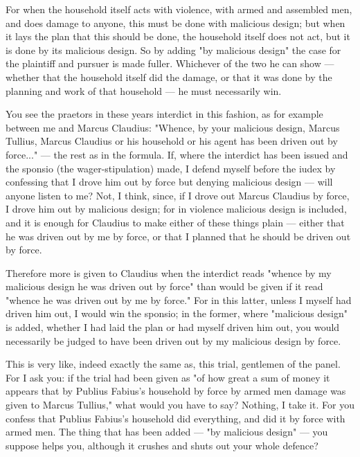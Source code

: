  For when the household itself acts with violence, with armed and assembled men, and does damage to anyone, this must be done with malicious design; but when it lays the plan that this should be done, the household itself does not act, but it is done by its malicious design. So by adding "by malicious design" the case for the plaintiff and pursuer is made fuller. Whichever of the two he can show --- whether that the household itself did the damage, or that it was done by the planning and work of that household --- he must necessarily win.

 You see the praetors in these years interdict in this fashion, as for example between me and Marcus Claudius: "Whence, by your malicious design, Marcus Tullius, Marcus Claudius or his household or his agent has been driven out by force..." --- the rest as in the formula. If, where the interdict has been issued and the sponsio (the wager-stipulation) made, I defend myself before the iudex by confessing that I drove him out by force but denying malicious design --- will anyone listen to me? Not, I think, since, if I drove out Marcus Claudius by force, I drove him out by malicious design; for in violence malicious design is included, and it is enough for Claudius to make either of these things plain --- either that he was driven out by me by force, or that I planned that he should be driven out by force.

 Therefore more is given to Claudius when the interdict reads "whence by my malicious design he was driven out by force" than would be given if it read "whence he was driven out by me by force." For in this latter, unless I myself had driven him out, I would win the sponsio; in the former, where "malicious design" is added, whether I had laid the plan or had myself driven him out, you would necessarily be judged to have been driven out by my malicious design by force.

 This is very like, indeed exactly the same as, this trial, gentlemen of the panel. For I ask you: if the trial had been given as "of how great a sum of money it appears that by Publius Fabius's household by force by armed men damage was given to Marcus Tullius," what would you have to say? Nothing, I take it. For you confess that Publius Fabius's household did everything, and did it by force with armed men. The thing that has been added --- "by malicious design" --- you suppose helps you, although it crushes and shuts out your whole defence?

